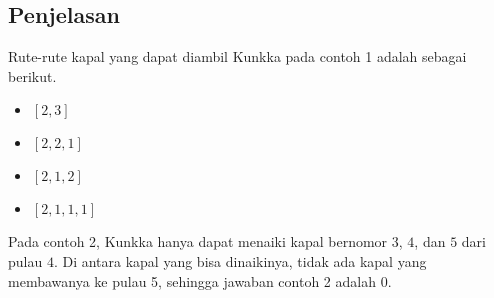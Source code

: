 \documentclass{article}
\begin{document}
\subsection*{Penjelasan}
Rute-rute kapal yang dapat diambil Kunkka pada contoh 1 adalah sebagai berikut.
\begin{itemize}
    \item $[2, 3]$
    \item $[2, 2, 1]$
    \item $[2, 1, 2]$
    \item $[2, 1, 1, 1]$
\end{itemize}
Pada contoh 2, Kunkka hanya dapat menaiki kapal bernomor $3$, $4$, dan $5$ dari pulau $4$. Di antara kapal yang bisa dinaikinya, tidak ada kapal yang membawanya ke pulau 5, sehingga jawaban contoh 2 adalah $0$.
\end{document}
